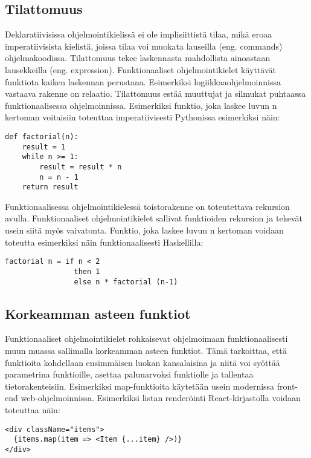 \subsection{Tilattomuus}
Deklaratiivisissa ohjelmointikielissä ei ole implisiittistä tilaa, mikä eroaa imperatiivisista kielistä, joissa tilaa
voi muokata lauseilla (eng. commands) ohjelmakoodissa. Tilattomuus tekee laskennasta mahdollista ainoastaan lausekkeilla
(eng. expression). Funktionaaliset ohjelmointikielet käyttävät funktiota kaiken laskennan perustana. Esimerkiksi
logiikkaaohjelmoinnissa vastaava rakenne on relaatio. Tilattomuus estää muuttujat ja silmukat puhtaassa
funktionaalisessa ohjelmoinnissa. Esimerkiksi funktio, joka laskee luvun n kertoman voitaisiin toteuttaa
imperatiivisesti Pythonissa esimerkiksi näin:
\begin{verbatim}
def factorial(n):
    result = 1
    while n >= 1:
        result = result * n
        n = n - 1
    return result
\end{verbatim}
Funktionaalisessa ohjelmointikielessä toistorakenne on toteutettava rekursion avulla. Funktionaaliset ohjelmointikielet
sallivat funktioiden rekursion ja tekevät usein siitä myös vaivatonta.\cite{hudak} Funktio, joka laskee luvun n kertoman
voidaan toteutta esimerkiksi näin funktionaalisesti Haskellilla:
\begin{verbatim}
factorial n = if n < 2
                then 1
                else n * factorial (n-1)
\end{verbatim}

\subsection{Korkeamman asteen funktiot}
Funktionaaliset ohjelmointikielet rohkaisevat ohjelmoimaan funktionaalisesti muun muassa sallimalla korkeamman asteen
funktiot. Tämä tarkoittaa, että funktioita kohdellaan ensimmäisen luokan kansalaisina ja niitä voi syöttää parametrina
funktioille, asettaa paluuarvoksi funktiolle ja tallentaa tietorakenteisiin.\cite{hudak} Esimerkiksi map-funktioita
käytetään usein modernissa front-end web-ohjelmoinnissa\cite{functionalreact}. Esimerkiksi listan renderöinti
React-kirjastolla voidaan toteuttaa näin:
\begin{verbatim}
<div className="items">
  {items.map(item => <Item {...item} />)}
</div>
\end{verbatim}

